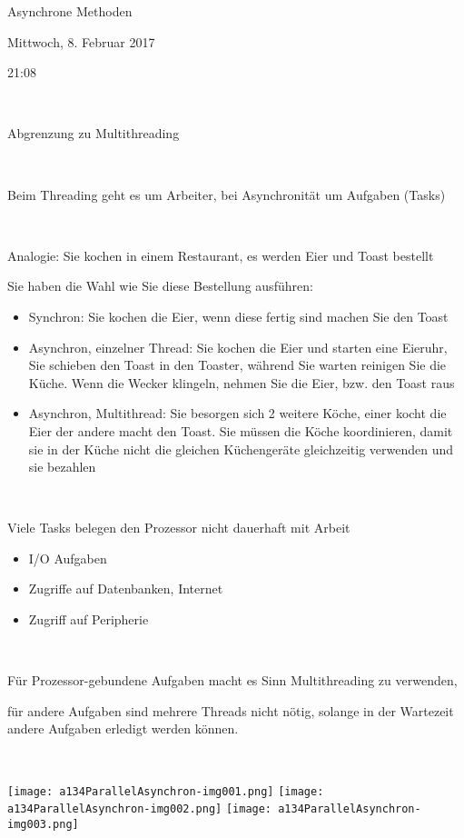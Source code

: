 Asynchrone Methoden

Mittwoch, 8. Februar 2017

21:08

~

Abgrenzung zu Multithreading

~

Beim Threading geht es um Arbeiter, bei Asynchronität um Aufgaben (Tasks)

~

Analogie: Sie kochen in einem Restaurant, es werden Eier und Toast bestellt

Sie haben die Wahl wie Sie diese Bestellung ausführen:

\begin{itemize}
\item Synchron: Sie kochen die Eier, wenn diese fertig sind machen Sie den Toast
\item Asynchron, einzelner Thread: Sie kochen die Eier und starten eine Eieruhr, Sie schieben den Toast in den Toaster, während Sie warten reinigen Sie die Küche. Wenn die Wecker klingeln, nehmen Sie die Eier, bzw. den Toast raus
\item Asynchron, Multithread: Sie besorgen sich 2 weitere Köche, einer kocht die Eier der andere macht den Toast. Sie müssen die Köche koordinieren, damit sie in der Küche nicht die gleichen Küchengeräte gleichzeitig verwenden und sie bezahlen
\end{itemize}
~

Viele Tasks belegen den Prozessor nicht dauerhaft mit Arbeit

\begin{itemize}
\item I/O Aufgaben
\item Zugriffe auf Datenbanken, Internet
\item Zugriff auf Peripherie
\end{itemize}
~

Für Prozessor-gebundene Aufgaben macht es Sinn Multithreading zu verwenden,

für andere Aufgaben sind mehrere Threads nicht nötig, solange in der Wartezeit andere Aufgaben erledigt werden können.

~

 \texttt{[image: a134ParallelAsynchron-img001.png]}  \texttt{[image: a134ParallelAsynchron-img002.png]}  \texttt{[image: a134ParallelAsynchron-img003.png]} 
\endinput
